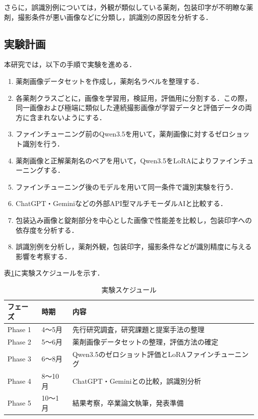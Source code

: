 \documentclass{ltjsarticle}
\begin{document}
さらに，誤識別例については，外観が類似している薬剤，包装印字が不明瞭な薬剤，撮影条件が悪い画像などに分類し，誤識別の原因を分析する．

\subsection{実験計画}

本研究では，以下の手順で実験を進める．

\begin{enumerate}
  \item 薬剤画像データセットを作成し，薬剤名ラベルを整理する．
  \item 各薬剤クラスごとに，画像を学習用，検証用，評価用に分割する．この際，同一画像および極端に類似した連続撮影画像が学習データと評価データの両方に含まれないようにする．
  \item ファインチューニング前のQwen3.5を用いて，薬剤画像に対するゼロショット識別を行う．
  \item 薬剤画像と正解薬剤名のペアを用いて，Qwen3.5をLoRAによりファインチューニングする．
  \item ファインチューニング後のモデルを用いて同一条件で識別実験を行う．
  \item ChatGPT・Geminiなどの外部API型マルチモーダルAIと比較する．
  \item 包装込み画像と錠剤部分を中心とした画像で性能差を比較し，包装印字への依存度を分析する．
  \item 誤識別例を分析し，薬剤外観，包装印字，撮影条件などが識別精度に与える影響を考察する．
\end{enumerate}

表\ref{tab:schedule}に実験スケジュールを示す．

\begin{table}[h]
\centering
\caption{実験スケジュール}
\label{tab:schedule}
\begin{tabular}{lll}
\hline
フェーズ & 時期 & 内容 \\
\hline
Phase 1 & 4〜5月  & 先行研究調査，研究課題と提案手法の整理 \\
Phase 2 & 5〜6月  & 薬剤画像データセットの整理，評価方法の確定 \\
Phase 3 & 6〜8月  & Qwen3.5のゼロショット評価とLoRAファインチューニング \\
Phase 4 & 8〜10月 & ChatGPT・Geminiとの比較，誤識別分析 \\
Phase 5 & 10〜1月 & 結果考察，卒業論文執筆，発表準備 \\
\hline
\end{tabular}
\end{table}
\end{document}
